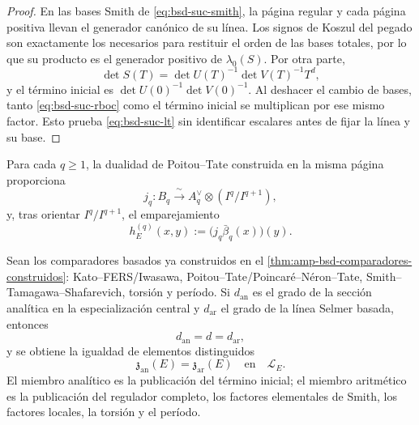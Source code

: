 \begin{proof}
En las bases Smith de \eqref{eq:bsd-suc-smith}, la página regular y cada
página positiva llevan el generador canónico de su línea. Los signos de
Koszul del pegado son exactamente los necesarios para restituir el orden de
las bases totales, por lo que su producto es el generador positivo de
\(\lambda_0(S)\). Por otra parte,
\[
 \det S(T)=\det U(T)^{-1}\det V(T)^{-1}T^d,
\]
y el término inicial es
\(\det U(0)^{-1}\det V(0)^{-1}\). Al deshacer el cambio de bases, tanto
\eqref{eq:bsd-suc-rboc} como el término inicial se multiplican por ese mismo
factor. Esto prueba \eqref{eq:bsd-suc-lt} sin identificar escalares antes de
fijar la línea y su base.
\end{proof}

Para cada \(q\geq1\), la dualidad de Poitou--Tate construida en la misma
página proporciona
\begin{equation}\label{eq:bsd-suc-jq}
 j_q:B_q\xrightarrow{\ \sim\ }
 A_q^{\vee}\otimes(I^q/I^{q+1}),
\end{equation}
y, tras orientar \(I^q/I^{q+1}\), el emparejamiento
\begin{equation}\label{eq:bsd-suc-altura-derivada}
 h_E^{(q)}(x,y)
 :=\bigl(j_q\bar\beta_q(x)\bigr)(y).
\end{equation}



\begin{theorem}
\label{thm:bsd-suc-local-global}
Sean los comparadores basados ya construidos en el
\cref{thm:amp-bsd-comparadores-construidos}:
Kato--FERS/Iwasawa,
Poitou--Tate/Poincaré--Néron--Tate,
Smith--Tamagawa--Shafarevich, torsión y período.
Si \(d_{\mathrm{an}}\) es el grado de la sección analítica en la
especialización central y \(d_{\mathrm{ar}}\) el grado de la línea Selmer
basada, entonces
\begin{equation}\label{eq:bsd-suc-grados}
 d_{\mathrm{an}}=d=d_{\mathrm{ar}},
\end{equation}
y se obtiene la igualdad de elementos distinguidos
\begin{equation}\label{eq:bsd-suc-linea-final}
 \mathfrak z_{\mathrm{an}}(E)=\mathfrak z_{\mathrm{ar}}(E)
 \quad\text{en}\quad\mathcal L_E.
\end{equation}
El miembro analítico es la publicación del término inicial; el miembro
aritmético es la publicación del regulador completo, los factores
elementales de Smith,
los factores locales, la torsión y el período.
\end{theorem}

